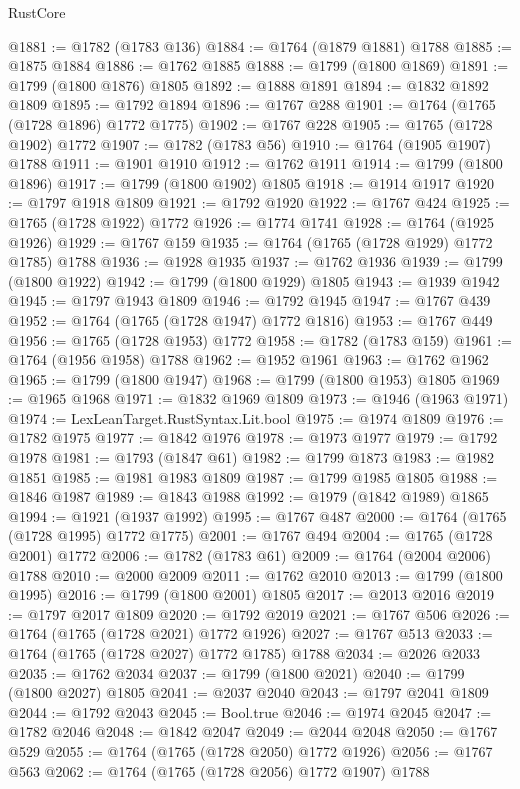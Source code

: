 \begin{lexlean}{RustCore}
\begin{coremodule}
@1881 := @1782 (@1783 @136)
@1884 := @1764 (@1879 @1881) @1788
@1885 := @1875 @1884
@1886 := @1762 @1885
@1888 := @1799 (@1800 @1869)
@1891 := @1799 (@1800 @1876) @1805
@1892 := @1888 @1891
@1894 := @1832 @1892 @1809
@1895 := @1792 @1894
@1896 := @1767 @288
@1901 := @1764 (@1765 (@1728 @1896) @1772 @1775)
@1902 := @1767 @228
@1905 := @1765 (@1728 @1902) @1772
@1907 := @1782 (@1783 @56)
@1910 := @1764 (@1905 @1907) @1788
@1911 := @1901 @1910
@1912 := @1762 @1911
@1914 := @1799 (@1800 @1896)
@1917 := @1799 (@1800 @1902) @1805
@1918 := @1914 @1917
@1920 := @1797 @1918 @1809
@1921 := @1792 @1920
@1922 := @1767 @424
@1925 := @1765 (@1728 @1922) @1772
@1926 := @1774 @1741
@1928 := @1764 (@1925 @1926)
@1929 := @1767 @159
@1935 := @1764 (@1765 (@1728 @1929) @1772 @1785) @1788
@1936 := @1928 @1935
@1937 := @1762 @1936
@1939 := @1799 (@1800 @1922)
@1942 := @1799 (@1800 @1929) @1805
@1943 := @1939 @1942
@1945 := @1797 @1943 @1809
@1946 := @1792 @1945
@1947 := @1767 @439
@1952 := @1764 (@1765 (@1728 @1947) @1772 @1816)
@1953 := @1767 @449
@1956 := @1765 (@1728 @1953) @1772
@1958 := @1782 (@1783 @159)
@1961 := @1764 (@1956 @1958) @1788
@1962 := @1952 @1961
@1963 := @1762 @1962
@1965 := @1799 (@1800 @1947)
@1968 := @1799 (@1800 @1953) @1805
@1969 := @1965 @1968
@1971 := @1832 @1969 @1809
@1973 := @1946 (@1963 @1971)
@1974 := LexLeanTarget.RustSyntax.Lit.bool
@1975 := @1974 @1809
@1976 := @1782 @1975
@1977 := @1842 @1976
@1978 := @1973 @1977
@1979 := @1792 @1978
@1981 := @1793 (@1847 @61)
@1982 := @1799 @1873
@1983 := @1982 @1851
@1985 := @1981 @1983 @1809
@1987 := @1799 @1985 @1805
@1988 := @1846 @1987
@1989 := @1843 @1988
@1992 := @1979 (@1842 @1989) @1865
@1994 := @1921 (@1937 @1992)
@1995 := @1767 @487
@2000 := @1764 (@1765 (@1728 @1995) @1772 @1775)
@2001 := @1767 @494
@2004 := @1765 (@1728 @2001) @1772
@2006 := @1782 (@1783 @61)
@2009 := @1764 (@2004 @2006) @1788
@2010 := @2000 @2009
@2011 := @1762 @2010
@2013 := @1799 (@1800 @1995)
@2016 := @1799 (@1800 @2001) @1805
@2017 := @2013 @2016
@2019 := @1797 @2017 @1809
@2020 := @1792 @2019
@2021 := @1767 @506
@2026 := @1764 (@1765 (@1728 @2021) @1772 @1926)
@2027 := @1767 @513
@2033 := @1764 (@1765 (@1728 @2027) @1772 @1785) @1788
@2034 := @2026 @2033
@2035 := @1762 @2034
@2037 := @1799 (@1800 @2021)
@2040 := @1799 (@1800 @2027) @1805
@2041 := @2037 @2040
@2043 := @1797 @2041 @1809
@2044 := @1792 @2043
@2045 := Bool.true
@2046 := @1974 @2045
@2047 := @1782 @2046
@2048 := @1842 @2047
@2049 := @2044 @2048
@2050 := @1767 @529
@2055 := @1764 (@1765 (@1728 @2050) @1772 @1926)
@2056 := @1767 @563
@2062 := @1764 (@1765 (@1728 @2056) @1772 @1907) @1788

\end{coremodule}
\end{lexlean}
